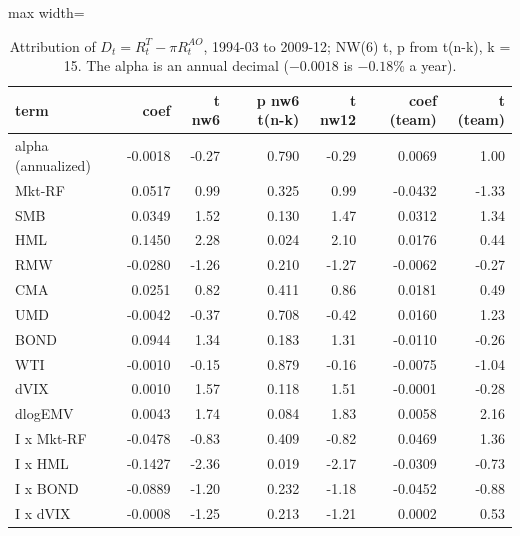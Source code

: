 \begin{table}[H]
\centering\small
\caption{Attribution of $D_t = R^T_t - \pi R^{AO}_t$, 1994-03 to 2009-12; NW(6) t, p from t(n-k), k = 15. The alpha is an annual decimal ($-0.0018$ is $-0.18$\% a year).}
\label{tab:m8_attribution}
\begin{adjustbox}{max width=\linewidth}
\begin{tabular}{lrrrrrr}
\toprule
term & coef & t nw6 & p nw6 t(n-k) & t nw12 & coef (team) & t (team) \\
\midrule
alpha (annualized) & -0.0018 & -0.27 & 0.790 & -0.29 & 0.0069 & 1.00 \\
Mkt-RF & 0.0517 & 0.99 & 0.325 & 0.99 & -0.0432 & -1.33 \\
SMB & 0.0349 & 1.52 & 0.130 & 1.47 & 0.0312 & 1.34 \\
HML & 0.1450 & 2.28 & 0.024 & 2.10 & 0.0176 & 0.44 \\
RMW & -0.0280 & -1.26 & 0.210 & -1.27 & -0.0062 & -0.27 \\
CMA & 0.0251 & 0.82 & 0.411 & 0.86 & 0.0181 & 0.49 \\
UMD & -0.0042 & -0.37 & 0.708 & -0.42 & 0.0160 & 1.23 \\
BOND & 0.0944 & 1.34 & 0.183 & 1.31 & -0.0110 & -0.26 \\
WTI & -0.0010 & -0.15 & 0.879 & -0.16 & -0.0075 & -1.04 \\
dVIX & 0.0010 & 1.57 & 0.118 & 1.51 & -0.0001 & -0.28 \\
dlogEMV & 0.0043 & 1.74 & 0.084 & 1.83 & 0.0058 & 2.16 \\
I x Mkt-RF & -0.0478 & -0.83 & 0.409 & -0.82 & 0.0469 & 1.36 \\
I x HML & -0.1427 & -2.36 & 0.019 & -2.17 & -0.0309 & -0.73 \\
I x BOND & -0.0889 & -1.20 & 0.232 & -1.18 & -0.0452 & -0.88 \\
I x dVIX & -0.0008 & -1.25 & 0.213 & -1.21 & 0.0002 & 0.53 \\
\bottomrule
\end{tabular}
\end{adjustbox}
\end{table}
